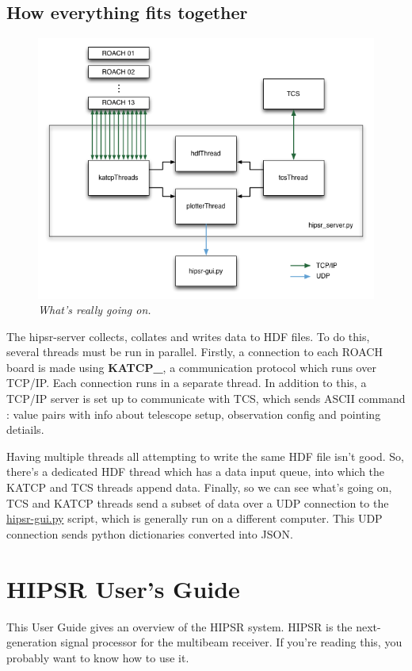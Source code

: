 \documentclass[letterpaper,10pt,english]{sphinxmanual}
\begin{document}
\section{How everything fits together}
\label{overview:how-everything-fits-together}\begin{figure}[htbp]
\centering
\capstart

\includegraphics{hipsr-server.png}
\caption{\emph{What's really going on.}}\end{figure}

The hipsr-server collects, collates and writes data to HDF files. To do this, several threads must be run in parallel. Firstly, a connection to each ROACH board is made using {\color{red}\bfseries{}KATCP\_}, a communication
protocol which runs over TCP/IP. Each connection runs in a separate thread. In addition to this, a
TCP/IP server is set up to communicate with TCS, which sends ASCII command : value pairs with info
about telescope setup, observation config and pointing detiails.

Having multiple threads all attempting to write the same HDF file isn't good. So, there's a dedicated
HDF thread which has a data input queue, into which the KATCP and TCS threads append data. Finally,
so we can see what's going on, TCS and KATCP threads send a subset of data over a UDP connection to
the {\hyperref[overview:hipsr-gui-py]{hipsr-gui.py}} script, which is generally run on a different computer. This UDP connection sends
python dictionaries converted into JSON.


\chapter{HIPSR User's Guide}
\label{user_guide:user-guide-chapter}\label{user_guide::doc}\label{user_guide:hipsr-user-s-guide}
This User Guide gives an overview of the HIPSR system. HIPSR is the next-generation
signal processor for the multibeam receiver. If you're reading this, you probably want
to know how to use it.
\end{document}
